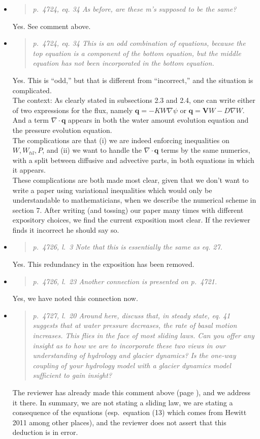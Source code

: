 \documentclass[11pt,reqno]{amsart}
\newcommand{\grad}{\nabla}
\newcommand{\reply}[2]{
\medskip\medskip
\item  \begin{quote}
\emph{#1}
\end{quote}

\medskip
\noindent #2}
\begin{document}
\begin{itemize}
\reply{p.~4724, eq. 34 As before, are these m's supposed to be the same?}
{Yes.  See comment above.}

\reply{p.~4724, eq. 34 This is an odd combination of equations, because the top equation is a component of the bottom equation, but the middle equation has not been incorporated in the bottom equation.}
{Yes.  This is ``odd,'' but that is different from ``incorrect,'' and the situation is complicated. \\
\indent The context: As clearly stated in subsections 2.3 and 2.4, one can write either of two expressions for the flux, namely $\mathbf{q} = -K W \grad \psi$ or $\mathbf{q} = \mathbf{V} W - D \grad W$.  And a term $\nabla\cdot\mathbf{q}$ appears in both the water amount evolution equation and the pressure evolution equation.  \\
\indent The complications are that (i) we are indeed enforcing inequalities on $W,W_{til},P$, and (ii) we want to handle the $\nabla\cdot\mathbf{q}$ terms by the same numerics, with a split between diffusive and advective parts, in both equations in which it appears.\\
\indent  These complications are both made most clear, given that we don't want to write a paper using variational inequalities which would only be understandable to mathematicians, when we describe the numerical scheme in section 7.  After writing (and tossing) our paper many times with different expository choices, we find the current exposition most clear.  If the reviewer finds it incorrect he should say so.}

\reply{p.~4726, l.~3 Note that this is essentially the same as eq. 27.}
{Yes.  This redundancy in the exposition has been removed.}

\reply{p.~4726, l.~23 Another connection is presented on p.~4721.}
{Yes, we have noted this connection now.}

\reply{p.~4727, l.~20 Around here, discuss that, in steady state, eq. 41 suggests that at water pressure decreases, the rate of basal motion increases. This flies in the face of most sliding laws. Can you offer any insight as to how we are to incorporate these two views in our understanding of hydrology and glacier dynamics?  Is the one-way coupling of your hydrology model with a glacier dynamics model sufficient to gain insight?}
{The reviewer has already made this comment above (page \pageref{inversepage}), and we address it there.  In summary, we are not stating a sliding law, we are stating a consequence of the equations (esp.~equation (13) which comes from Hewitt 2011 among other places), and the reviewer does not assert that this deduction is in error.}


\end{itemize}
\end{document}
